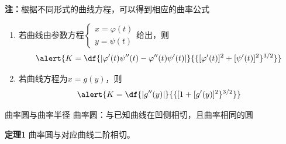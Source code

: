 \begin{frame}
	\linespread{1.2}
	\alert{{\bf 注：}根据不同形式的曲线方程，可以得到相应的曲率公式}\pause 
	\begin{enumerate}
	  \item 若曲线由参数方程$\left\{\begin{array}{l}
	  x=\varphi(t)\\ y=\psi(t)
	  \end{array}\right.$给出，\pause 则
	  $$\alert{K=\df{|\varphi'(t)\psi''(t)-\varphi''(t)\psi'(t)|}
		{\{[\varphi'(t)]^2+[\psi'(t)]^2\}^{3/2}}}$$\pause 
	  \item 若曲线方程为$x=g(y)$，\pause 则
		$$\alert{K=\df{|g''(y)|}{\{[1+[g'(y)]^2\}^{3/2}}}$$
	\end{enumerate}
\end{frame}


\begin{frame}{曲率圆与曲率半径}
	\linespread{1.2} \pause 
	{\bb 曲率圆：}与已知曲线在凹侧相切，且曲率相同的圆
	
	\pause\vspace{1ex}
			\begin{center}
			\end{center}
% 			
	\pause
	\vspace{-2ex}
	\begin{block}{\bf 定理1}
		曲率圆与对应曲线二阶相切。
	\end{block}
\end{frame}

